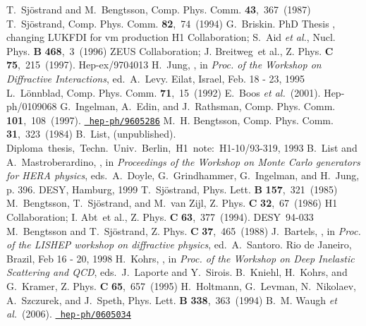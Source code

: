 \documentclass[10pt]{article} \usepackage{dina4}
\begin{document}
\begin{mcbibliography}{10}
\relax
{}
T.~Sj\"ostrand and M.~Bengtsson,
\newblock Comp. Phys. Comm.{} {\bf 43},~367~(1987)\relax
\relax
{}
T.~Sj\"ostrand,
\newblock Comp. Phys. Comm.{} {\bf 82},~74~(1994)\relax
\relax
{}
G.~Briskin.
\newblock PhD Thesis , changing LUKFDI for vm production\relax
\relax
{}
\mbox{H1} Collaboration; S.~Aid {\em et al.},
\newblock Nucl. Phys. {\bf B}{} {\bf 468},~3~(1996)\relax
\relax
{}
\mbox{ZEUS} Collaboration; J. Breitweg~et al.,
\newblock Z. Phys. {\bf C}{} {\bf 75},~215~(1997).
\newblock Hep-ex/9704013\relax
\relax
{}
H.~Jung,
,
\newblock in {\em Proc. of the Workshop on Diffractive Interactions},
  ed.~A.~Levy.
\newblock Eilat, Israel, Feb. 18 - 23, 1995\relax
\relax
{}
L.~L\"onnblad,
\newblock Comp. Phys. Comm.{} {\bf 71},~15~(1992)\relax
\relax
{}
E.~Boos {\em et al.}~(2001).
\newblock Hep-ph/0109068\relax
\relax
{}
G.~Ingelman, A.~Edin, and J.~Rathsman,
\newblock Comp. Phys. Comm.{} {\bf 101},~108~(1997).
\newblock \href{http://www.arXiv.org/abs/hep-ph/9605286}{{\tt
  hep-ph/9605286}}\relax
\relax
{}
M.~H. Bengtsson,
\newblock Comp. Phys. Comm.{} {\bf 31},~323~(1984)\relax
\relax
{}
B.~List,
 (unpublished).
\newblock \mbox{Diploma thesis, Techn. Univ. Berlin, H1 note: H1-10/93-319},
  1993\relax
\relax
{}
B.~List and A.~Mastroberardino,
,
\newblock in {\em Proceedings of the Workshop on Monte Carlo generators for
  HERA physics}, eds.~A.~Doyle, G.~Grindhammer, G.~Ingelman, and H.~Jung, p.
  396.
\newblock \mbox{DESY}, Hamburg, 1999\relax
\relax
{}
T.~Sj\"ostrand,
\newblock Phys. Lett. {\bf B}{} {\bf 157},~321~(1985)\relax
\relax
{}
M.~Bengtsson, T.~Sj\"ostrand, and M.~van Zijl,
\newblock Z. Phys. {\bf C}{} {\bf 32},~67~(1986)\relax
\relax
{}
\mbox{H1} Collaboration; I. Abt~et al.,
\newblock Z. Phys. {\bf C}{} {\bf 63},~377~(1994).
\newblock \mbox{DESY 94-033}\relax
\relax
{}
M.~Bengtsson and T.~Sj\"ostrand,
\newblock Z. Phys. {\bf C}{} {\bf 37},~465~(1988)\relax
\relax
{}
J.~Bartels,
,
\newblock in {\em Proc. of the LISHEP workshop on diffractive physics},
  ed.~A.~Santoro.
\newblock Rio de Janeiro, Brazil, Feb 16 - 20, 1998\relax
\relax
{}
H.~Kohrs,
,
\newblock in {\em Proc. of the Workshop on Deep Inelastic Scattering and QCD},
  eds.~J.~Laporte and Y.~Sirois.
\relax
\relax
{}
B.~Kniehl, H.~Kohrs, and G.~Kramer,
\newblock Z. Phys. {\bf C}{} {\bf 65},~657~(1995)\relax
\relax
{}
H.~Holtmann, G.~Levman, N.~Nikolaev, A.~Szczurek, and J.~Speth,
\newblock Phys. Lett. {\bf B}{} {\bf 338},~363~(1994)\relax
\relax
{}
B.~M. Waugh {\em et al.}~(2006).
\newblock \href{http://www.arXiv.org/abs/hep-ph/0605034}{{\tt
  hep-ph/0605034}}\relax
\relax
\end{mcbibliography}
\end{document}
